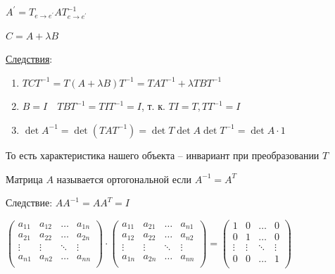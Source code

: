 \documentclass[12pt]{article}
\begin{document}
    \begin{MyTheorem}
        \Ths $A^\prime = T_{e\to e^\prime} A T^{-1}_{e\to e^\prime}$
    \end{MyTheorem}

    \Nota $C = A + \lambda B$

    \underline{Следствия}:

    \begin{enumerate}
        \item $TCT^{-1} = T (A + \lambda B) T^{-1} = T A T^{-1} + \lambda T B T^{-1}$

        \item $B = I \quad T B T^{-1} = T I T^{-1} = I$, т. к. $TI = T, T T^{-1} = I$

        \item $\det A^{-1} = \det (T A T^{-1}) = \det T \det A \det T^{-1} = \det A \cdot 1$
    \end{enumerate}

    \Nota То есть характеристика нашего объекта -- инвариант при преобразовании $T$

    \hypertarget{orthogonalmatrix}{}

    \Def Матрица $A$ называется ортогональной если $A^{-1} = A^T$

    Следствие: $AA^{-1} = AA^T = I$

    $\begin{pmatrix}
         a_{11} & a_{12} & \dots & a_{1n} \\
         a_{21} & a_{22} & \dots & a_{2n} \\
         \vdots & \vdots & \ddots & \vdots \\
         a_{n1} & a_{n2} & \dots & a_{nn} \\
    \end{pmatrix} \cdot \begin{pmatrix}
         a_{11} & a_{21} & \dots & a_{n1} \\
         a_{12} & a_{22} & \dots & a_{n2} \\
         \vdots & \vdots & \ddots & \vdots \\
         a_{1n} & a_{2n} & \dots & a_{nn} \\
    \end{pmatrix} = \begin{pmatrix}
         1 & 0 & \dots & 0 \\
         0 & 1 & \dots & 0 \\
         \vdots & \vdots & \ddots & \vdots \\
         0 & 0 & \dots & 1 \\
    \end{pmatrix}$
\end{document}
